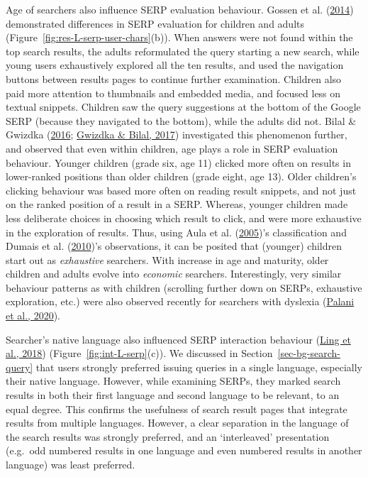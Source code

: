 \documentclass[letterpaper, nobind]{templates/ociamthesis}
\begin{document}
Age of searchers also influence SERP evaluation behaviour. Gossen et al. (\protect\hyperlink{ref-124}{2014})
demonstrated differences in SERP evaluation for children and adults
(Figure~\ref{fig:res-L-serp-user-chars}(b)). When answers were not found
within the top search results, the adults reformulated the query
starting a new search, while young users exhaustively explored all the
ten results, and used the navigation buttons between results pages to
continue further examination. Children also paid more attention to
thumbnails and embedded media, and focused less on textual snippets.
Children saw the query suggestions at the bottom of the Google SERP
(because they navigated to the bottom), while the adults did not. Bilal \& Gwizdka (\protect\hyperlink{ref-139}{2016}; \protect\hyperlink{ref-140}{Gwizdka \& Bilal, 2017}) investigated this phenomenon further, and observed that even
within children, age plays a role in SERP evaluation behaviour. Younger
children (grade six, age 11) clicked more often on results in
lower-ranked positions than older children (grade eight, age 13). Older
children's clicking behaviour was based more often on reading result
snippets, and not just on the ranked position of a result in a SERP.
Whereas, younger children made less deliberate choices in choosing which
result to click, and were more exhaustive in the exploration of results.
Thus, using Aula et al. (\protect\hyperlink{ref-102}{2005})'s classification and Dumais et al. (\protect\hyperlink{ref-117}{2010})'s observations, it can be
posited that (younger) children start out as \emph{exhaustive} searchers.
With increase in age and maturity, older children and adults evolve into
\emph{economic} searchers. Interestingly, very similar behaviour patterns as
with children (scrolling further down on SERPs, exhaustive exploration,
etc.) were also observed recently for searchers with dyslexia
(\protect\hyperlink{ref-palani2020eye}{Palani et al., 2020}).

Searcher's native language also influenced SERP interaction behaviour
(\protect\hyperlink{ref-132}{Ling et al., 2018}) (Figure~\ref{fig:int-L-serp}(c)). We discussed in
Section~\ref{sec-bg-search-query} that users strongly preferred issuing
queries in a single language, especially their native language. However,
while examining SERPs, they marked search results in both their first
language and second language to be relevant, to an equal degree. This
confirms the usefulness of search result pages that integrate results
from multiple languages. However, a clear separation in the language of
the search results was strongly preferred, and an `interleaved'
presentation (e.g.~odd numbered results in one language and even
numbered results in another language) was least preferred.
\end{document}
